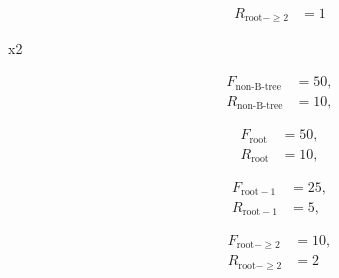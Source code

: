 \begin{frame}
\begin{description}
\begin{minipage}[t]{.225\linewidth}
\begin{align*}
                            R_{\text{root} - \geq 2} &= 1
                        \end{align*}
                    \end{minipage}%
                    \vspace{-3em}
        \item[x2]   \noindent\begin{minipage}[t]{.225\linewidth}
                        \vspace{-2em}
                        \begin{align*}
                            F_{\text{non-B-tree}} &= 50,\\
                            R_{\text{non-B-tree}} &= 10,
                        \end{align*}
                    \end{minipage}%
                    \noindent\begin{minipage}[t]{.225\linewidth}
                        \vspace{-2em}
                        \begin{align*}
                            F_{\text{root}} &= 50,\\
                            R_{\text{root}} &= 10,
                        \end{align*}\break
                    \end{minipage}%
                    \noindent\begin{minipage}[t]{.225\linewidth}
                        \vspace{-2em}
                        \begin{align*}
                            F_{\text{root} - 1} &= 25,\\
                            R_{\text{root} - 1} &= 5,
                        \end{align*}\break
                    \end{minipage}%
                    \noindent\begin{minipage}[t]{.225\linewidth}
                        \vspace{-2em}
                        \begin{align*}
                            F_{\text{root} - \geq 2} &= 10,\\
                            R_{\text{root} - \geq 2} &= 2
                        \end{align*}
                    \end{minipage}%
                    \vspace{-3em}
    \end{description}
\end{frame}

